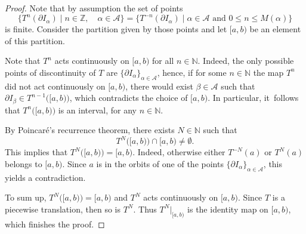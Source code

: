 \documentclass[10pt,a4paper]{article}
\theoremstyle{plain}
\theoremstyle{definition}
\newcommand{\A}{\mathcal{A}}
\newcommand{\Z}{\mathbb{Z}}
\newcommand{\N}{\mathbb{N}}
\begin{document}
\begin{proof}
Note that by assumption the set of points
\[
\{T^{n}(\partial I_{\alpha})\mid n\in\Z,\quad\alpha\in \A\}=\{T^{-n}(\partial I_{\alpha})\mid \alpha\in\A\text{ and } 0\le n\le M(\alpha)\}
\]
is finite. Consider the partition given by those points and let $[a,b)$ be an element of this partition.

Note that $T^n$ acts continuously on $[a,b)$ for all $n\in\N$. Indeed, the only possible points of discontinuity of $T$ are $\{\partial I_{\alpha}\}_{\alpha\in\A}$, hence, if for some $n\in\N$ the map $T^n$ did not act continuously on $[a,b)$, there would exist $\beta\in\mathcal A$ such that $\partial I_{\beta}\in T^{n-1}\big([a,b)\big)$, which contradicts the choice of $[a,b)$. In particular, it~follows that $T^n\big([a,b)\big)$ is an interval, for any $n \in \N$.

By Poincaré's recurrence theorem, there exists $N\in\N$ such that
\[
T^{N}\big([a,b)\big)\cap [a,b)\neq \emptyset.
\]
This implies that $T^{N}\big([a,b)\big)=[a,b)$. Indeed, otherwise either $T^{-N}(a)$ or $T^{N}(a)$ belongs to $[a,b)$. Since $a$ is in the orbits of one of the points $\{\partial I_{\alpha}\}_{\alpha\in\A}$, this yields a contradiction.

To sum up, $T^{N}\big([a,b)\big)=[a,b)$ and $T^N$ acts continuously on $[a,b)$. Since $T$ is a piecewise translation, then so is $T^N$. Thus $T^N|_{[a,b)}$ is the identity map on $[a,b)$, which finishes the proof.
\end{proof}
\end{document}
